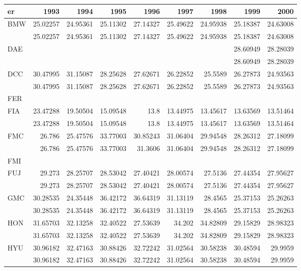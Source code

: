 \begin{tabular}{lrrrrrrrr}
\toprule
er & 1993 & 1994 & 1995 & 1996 & 1997 & 1998 & 1999 & 2000 \\
\midrule
BMW & 25.02257 & 24.95361 & 25.11302 & 27.14327 & 25.49622 & 24.95938 & 25.18387 & 24.63008 \\
 & 25.02257 & 24.95361 & 25.11302 & 27.14327 & 25.49622 & 24.95938 & 25.18387 & 24.63008 \\
DAE &  &  &  &  &  &  & 28.60949 & 28.28039 \\
 &  &  &  &  &  &  & 28.60949 & 28.28039 \\
DCC & 30.47995 & 31.15087 & 28.25628 & 27.62671 & 26.22852 & 25.5589 & 26.27873 & 24.93563 \\
 & 30.47995 & 31.15087 & 28.25628 & 27.62671 & 26.22852 & 25.5589 & 26.27873 & 24.93563 \\
FER &  &  &  &  &  &  &  &  \\
FIA & 23.47288 & 19.50504 & 15.09548 & 13.8 & 13.44975 & 13.45617 & 13.63569 & 13.51464 \\
 & 23.47288 & 19.50504 & 15.09548 & 13.8 & 13.44975 & 13.45617 & 13.63569 & 13.51464 \\
FMC & 26.786 & 25.47576 & 33.77003 & 30.85243 & 31.06404 & 29.94548 & 28.26312 & 27.18099 \\
 & 26.786 & 25.47576 & 33.77003 & 31.3606 & 31.06404 & 29.94548 & 28.26312 & 27.18099 \\
FMI &  &  &  &  &  &  &  &  \\
FUJ & 29.273 & 28.25707 & 28.53042 & 27.40421 & 28.00574 & 27.5136 & 27.44354 & 27.95627 \\
 & 29.273 & 28.25707 & 28.53042 & 27.40421 & 28.00574 & 27.5136 & 27.44354 & 27.95627 \\
GMC & 30.28535 & 24.35448 & 36.42172 & 36.64319 & 31.13119 & 28.4565 & 25.37153 & 25.26263 \\
 & 30.28535 & 24.35448 & 36.42172 & 36.64319 & 31.13119 & 28.4565 & 25.37153 & 25.26263 \\
HON & 31.65703 & 32.13258 & 32.40522 & 27.53639 & 34.202 & 34.82809 & 29.15829 & 28.98323 \\
 & 31.65703 & 32.13258 & 32.40522 & 27.53639 & 34.202 & 34.82809 & 29.15829 & 28.98323 \\
HYU & 30.96182 & 32.47163 & 30.88426 & 32.72242 & 31.02564 & 30.58238 & 30.48594 & 29.9959 \\
 & 30.96182 & 32.47163 & 30.88426 & 32.72242 & 31.02564 & 30.58238 & 30.48594 & 29.9959 \\

\end{tabular}
